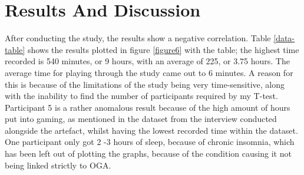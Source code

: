 \documentclass[conference]{IEEEtran}
\begin{document}
\section{Results And Discussion}
\begin{table}[H]
\centering
{}
\caption{Table 1 - The data collected from the experiment over two weeks.}
\label{data-table}
\end{table}

After conducting the study, the results show a negative correlation.  Table \ref{data-table} shows the results plotted in figure \ref{figure6} with the table; the highest time recorded is 540 minutes, or 9 hours, with an average of 225, or 3.75 hours. The average time for playing through the study came out to 6 minutes. A reason for this is because of the limitations of the study being very time-sensitive, along with the inability to find the number of participants required by my T-test. Participant 5 is a rather anomalous result because of the high amount of hours put into gaming, as mentioned in the dataset from the interview conducted alongside the artefact, whilst having the lowest recorded time within the dataset. One participant only got 2 -3 hours of sleep, because of chronic insomnia, which has been left out of plotting the graphs, because of the condition causing it not being linked strictly to OGA.
\end{document}
